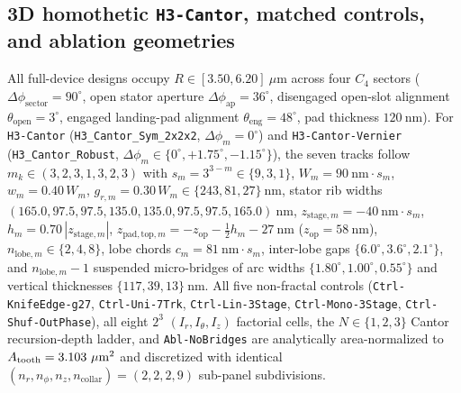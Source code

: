 \documentclass[pdflatex,sn-nature]{sn-jnl}
\begin{document}
\subsection*{3D homothetic \texttt{H3-Cantor}, matched controls, and ablation geometries}
All full-device designs occupy $R \in [3.50, 6.20]\ \mu\mathrm{m}$ across four $C_4$ sectors ($\Delta\phi_{\mathrm{sector}}=90^\circ$, open stator aperture $\Delta\phi_{\mathrm{ap}}=36^\circ$, disengaged open-slot alignment $\theta_{\mathrm{open}}=3^\circ$, engaged landing-pad alignment $\theta_{\mathrm{eng}}=48^\circ$, pad thickness $120\ \mathrm{nm}$). For \texttt{H3-Cantor} (\texttt{H3\_Cantor\_Sym\_2x2x2}, $\Delta\phi_m=0^\circ$) and \texttt{H3-Cantor-Vernier} (\texttt{H3\_Cantor\_Robust}, $\Delta\phi_m \in \{0^\circ, +1.75^\circ, -1.15^\circ\}$), the seven tracks follow $m_k \in (3,2,3,1,3,2,3)$ with $s_m = 3^{3-m} \in \{9,3,1\}$, $W_m = 90\ \mathrm{nm}\cdot s_m$, $w_m = 0.40\,W_m$, $g_{r,m} = 0.30\,W_m \in \{243, 81, 27\}\ \mathrm{nm}$, stator rib widths $(165.0, 97.5, 97.5, 135.0, 135.0, 97.5, 97.5, 165.0)\ \mathrm{nm}$, $z_{\mathrm{stage},m} = -40\ \mathrm{nm}\cdot s_m$, $h_m = 0.70\,|z_{\mathrm{stage},m}|$, $z_{\mathrm{pad,top},m} = -z_{\mathrm{op}} - \frac{1}{2}h_m - 27\ \mathrm{nm}$ ($z_{\mathrm{op}} = 58\ \mathrm{nm}$), $n_{\mathrm{lobe},m} \in \{2,4,8\}$, lobe chords $c_m = 81\ \mathrm{nm}\cdot s_m$, inter-lobe gaps $\{6.0^\circ, 3.6^\circ, 2.1^\circ\}$, and $n_{\mathrm{lobe},m}-1$ suspended micro-bridges of arc widths $\{1.80^\circ, 1.00^\circ, 0.55^\circ\}$ and vertical thicknesses $\{117, 39, 13\}\ \mathrm{nm}$. All five non-fractal controls (\texttt{Ctrl-KnifeEdge-g27}, \texttt{Ctrl-Uni-7Trk}, \texttt{Ctrl-Lin-3Stage}, \texttt{Ctrl-Mono-3Stage}, \texttt{Ctrl-Shuf-OutPhase}), all eight $2^3$ $(I_r,I_\theta,I_z)$ factorial cells, the $N \in \{1,2,3\}$ Cantor recursion-depth ladder, and \texttt{Abl-NoBridges} are analytically area-normalized to $A_{\mathrm{tooth}} = \RobAtoothUmtwoDisp{}\ \mu\mathrm{m}^2$ and discretized with identical $(n_r, n_\phi, n_z, n_{\mathrm{collar}}) = (2,2,2,9)$ sub-panel subdivisions.
\end{document}

